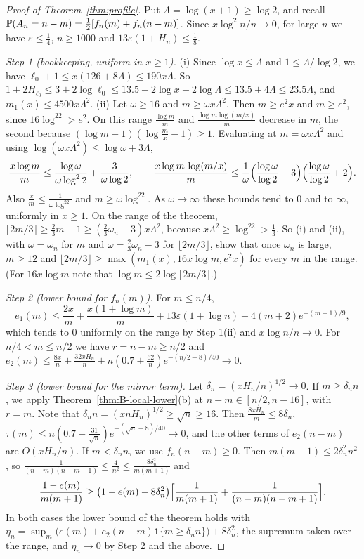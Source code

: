 \begin{proof}[Proof of Theorem~\ref{thm:profile}]
Put $\Lambda=\log(x+1)\ge\log2$, and recall
$\mathbb{P}(A_n=n-m)=\frac12[f_n(m)+f_n(n-m)]$. Since $x\log^2n/n\to0$, for
large $n$ we have $\varepsilon\le\frac14$, $n\ge1000$ and
$13\varepsilon(1+H_n)\le\frac18$.

\emph{Step 1 (bookkeeping, uniform in $x\ge1$).} (i) Since $\log x\le\Lambda$
and $1\le\Lambda/\log2$, we have $\ell_0+1\le x(126+8\Lambda)\le190x\Lambda$.
So $1+2H_{\ell_0}\le3+2\log\ell_0\le13.5+2\log x+2\log\Lambda\le13.5+4\Lambda\le23.5\Lambda$,
and $m_1(x)\le4500x\Lambda^2$.
(ii) Let $\omega\ge16$ and $m\ge\omega x\Lambda^2$. Then $m\ge e^2x$ and
$m\ge e^2$, since $16\log^22>e^2$. On this range $\frac{\log m}m$ and
$\frac{\log m\log(m/x)}m$ decrease in $m$, the second because
$(\log m-1)(\log\frac mx-1)\ge1$. Evaluating at $m=\omega x\Lambda^2$ and
using $\log(\omega x\Lambda^2)\le\log\omega+3\Lambda$,
\[
 \frac{x\log m}m\le\frac{\log\omega}{\omega\log^22}+\frac3{\omega\log2},\qquad
 \frac{x\log m\,\log(m/x)}m\le\frac1\omega\Bigl(\frac{\log\omega}{\log2}+3\Bigr)\Bigl(\frac{\log\omega}{\log2}+2\Bigr).
\]
Also $\frac xm\le\frac1{\omega\log^22}$ and $m\ge\omega\log^22$. As
$\omega\to\infty$ these bounds tend to $0$ and to $\infty$, uniformly in
$x\ge1$. On the range of the theorem,
$\lfloor2m/3\rfloor\ge\frac23m-1\ge(\frac23\omega_n-3)x\Lambda^2$, because
$x\Lambda^2\ge\log^22>\frac13$. So (i) and (ii), with $\omega=\omega_n$ for
$m$ and $\omega=\frac23\omega_n-3$ for $\lfloor2m/3\rfloor$, show that once
$\omega_n$ is large, $m\ge12$ and
$\lfloor2m/3\rfloor\ge\max(m_1(x),16x\log m,e^2x)$ for every $m$ in the
range. (For $16x\log m$ note that $\log m\le2\log\lfloor2m/3\rfloor$.)

\emph{Step 2 (lower bound for $f_n(m)$).} For $m\le n/4$,
\[
 e_1(m)\le\frac{2x}m+\frac{x(1+\log m)}m+13\varepsilon(1+\log n)+4(m+2)e^{-(m-1)/9},
\]
which tends to $0$ uniformly on the range by Step 1(ii) and
$x\log n/n\to0$. For $n/4<m\le n/2$ we have $r=n-m\ge n/2$ and
$e_2(m)\le\frac{8x}n+\frac{32xH_n}n+n(0.7+\frac{62}n)e^{-(n/2-8)/40}\to0$.

\emph{Step 3 (lower bound for the mirror term).} Let
$\delta_n=(xH_n/n)^{1/2}\to0$. If $m\ge\delta_nn$, we apply
Theorem~\ref{thm:B-local-lower}(b) at $n-m\in[n/2,n-16]$, with $r=m$. Note
that $\delta_nn=(xnH_n)^{1/2}\ge\sqrt n\ge16$. Then
$\frac{8xH_n}m\le8\delta_n$,
$\tau(m)\le n(0.7+\frac{31}{\sqrt n})e^{-(\sqrt n-8)/40}\to0$, and the
other terms of $e_2(n-m)$ are $O(xH_n/n)$. If $m<\delta_nn$, we use
$f_n(n-m)\ge0$. Then $m(m+1)\le2\delta_n^2n^2$, so
$\frac1{(n-m)(n-m+1)}\le\frac4{n^2}\le\frac{8\delta_n^2}{m(m+1)}$ and
\[
 \frac{1-e(m)}{m(m+1)}\ge\bigl(1-e(m)-8\delta_n^2\bigr)
 \Bigl[\frac1{m(m+1)}+\frac1{(n-m)(n-m+1)}\Bigr].
\]
In both cases the lower bound of the theorem holds with
$\eta_n=\sup_m\bigl(e(m)+e_2(n-m)\mathbf 1\{m\ge\delta_nn\}\bigr)+8\delta_n^2$,
the supremum taken over the range, and $\eta_n\to0$ by Step 2 and the
above.


\end{proof}
